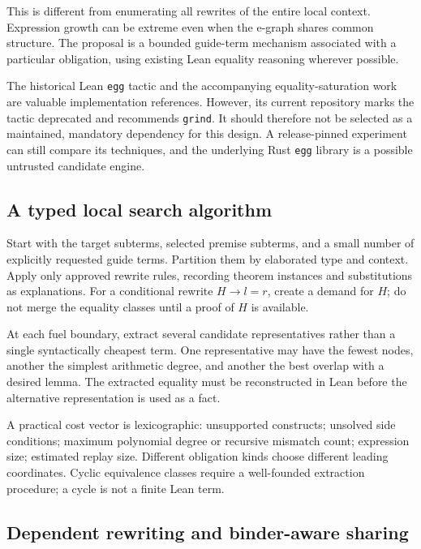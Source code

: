 \documentclass[11pt,a4paper]{article}
\newcommand{\grind}{\texttt{grind}}
\begin{document}
This is different from enumerating all rewrites of the entire local context. Expression growth can be extreme even when the e-graph shares common structure. The proposal is a bounded guide-term mechanism associated with a particular obligation, using existing Lean equality reasoning wherever possible.

The historical Lean \texttt{egg} tactic and the accompanying equality-saturation work are valuable implementation references. However, its current repository marks the tactic deprecated and recommends \grind. It should therefore not be selected as a maintained, mandatory dependency for this design. A release-pinned experiment can still compare its techniques, and the underlying Rust \texttt{egg} library is a possible untrusted candidate engine.\cite{lean-egg,eqsat-paper,egg-library}

\subsection{A typed local search algorithm}

Start with the target subterms, selected premise subterms, and a small number of explicitly requested guide terms. Partition them by elaborated type and context. Apply only approved rewrite rules, recording theorem instances and substitutions as explanations. For a conditional rewrite $H\to l=r$, create a demand for $H$; do not merge the equality classes until a proof of $H$ is available.

At each fuel boundary, extract several candidate representatives rather than a single syntactically cheapest term. One representative may have the fewest nodes, another the simplest arithmetic degree, and another the best overlap with a desired lemma. The extracted equality must be reconstructed in Lean before the alternative representation is used as a fact.

A practical cost vector is lexicographic: unsupported constructs; unsolved side conditions; maximum polynomial degree or recursive mismatch count; expression size; estimated replay size. Different obligation kinds choose different leading coordinates. Cyclic equivalence classes require a well-founded extraction procedure; a cycle is not a finite Lean term.

\subsection{Dependent rewriting and binder-aware sharing}
\end{document}
